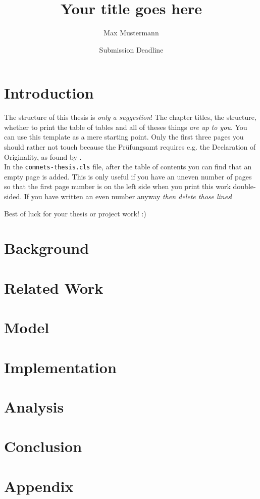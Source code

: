 \documentclass{comnets-thesis}
\title{Your title goes here}
\author{Max Mustermann}
\date{Submission Deadline}
\begin{document}
\maketitlepage

\chapter{Introduction}\label{chp:introduction}
The structure of this thesis is \emph{only a suggestion}! The chapter titles, the structure, whether to print the table of tables and all of theses things \emph{are up to you}. You can use this template as a mere starting point. Only the first three pages you should rather not touch because the Prüfungsamt requires e.g. the Declaration of Originality, as found by \cite{SuperSmartGuy}.\\
In the \texttt{comnets-thesis.cls} file, after the table of contents you can find that an empty page is added. This is only useful if you have an uneven number of pages so that the first page number is on the left side when you print this work double-sided. If you have written an even number anyway \emph{then delete those lines}!

Best of luck for your thesis or project work! :)

\chapter{Background}\label{chp:background}
\chapter{Related Work}\label{chp:related}
\chapter{Model}\label{chp:model}
\chapter{Implementation}\label{chp:implementation}
\chapter{Analysis}\label{chp:analysis}
\chapter{Conclusion}\label{chp:conclusion}
\appendix
\chapter{Appendix}\label{chp:appendix}
\listoffigures
\listoftables
\printbibliography[heading=bibintoc]
\end{document}

